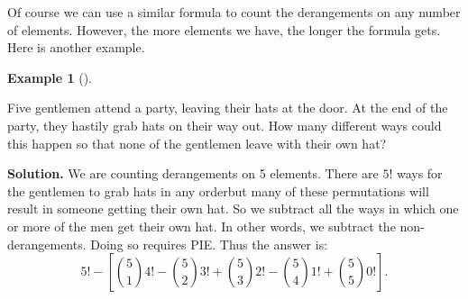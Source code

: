 \documentclass[10pt,]{book}
\theoremstyle{plain}
\theoremstyle{definition}
\newtheorem{example}[theorem]{Example}
\theoremstyle{definition}
\theoremstyle{definition}
\numberwithin{equation}{section}
\begin{document}
      Of course we can use a similar formula to count the derangements on any number of elements. However, the more elements we have, the longer the formula gets. Here is another example.
\begin{example}[]\label{example-50}

          Five gentlemen attend a party, leaving their hats at the door. At the end of the party, they hastily grab hats on their way out. How many different ways could this happen so that none of the gentlemen leave with their own hat?
\par\medskip\noindent%
\textbf{Solution.}\quad 
          We are counting derangements on 5 elements. There are \(5!\) ways for the gentlemen to grab hats in any order\textemdash{}but many of these permutations will result in someone getting their own hat. So we subtract all the ways in which one or more of the men get their own hat. In other words, we subtract the non-derangements. Doing so requires PIE. Thus the answer is:
          \begin{equation*}
            5! - \left[{5 \choose 1}4! - {5 \choose 2}3! + {5 \choose 3}2! - {5 \choose 4}1! + {5 \choose 5}0!\right].
          \end{equation*}
\end{example}
\typeout{************************************************}
\typeout{************************************************}
\end{document}
